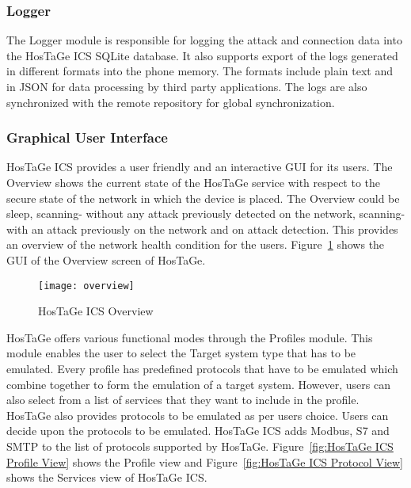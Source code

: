 \documentclass[article,msc=informatik,type=msc,colorback,accentcolor=tud9c]{tudthesis}
\begin{document}
       \subsubsection{Logger}\label{Logger}
       The Logger module is responsible for logging the attack and connection data into the HosTaGe ICS SQLite database. It also supports export of the logs generated in different formats into the phone memory. The formats include plain text and in \ac{JSON} for data processing by third party applications. The logs are also synchronized with the remote repository for global synchronization. 
       
       \vspace{5mm} 
       \subsubsection{Graphical User Interface}\label{Graphical User Interface}
       HosTaGe ICS provides a user friendly and an interactive GUI for its users. The Overview shows the current state of the HosTaGe service with respect to the secure state of the network in which the device is placed. The Overview could be sleep, scanning- without any attack previously detected on the network,  scanning- with an attack previously on the network and on attack detection. This provides an overview of the network health condition for the users. Figure~\ref{f:HosTaGe ICS Overview} shows the GUI of the Overview screen of  HosTaGe.
       
        \begin{figure}[h]
         \centering
                    \texttt{[image: overview]}
                    \caption[HosTaGe ICS Overview]{\label{f:HosTaGe ICS Overview}HosTaGe ICS Overview}
         \end{figure}
       
       HosTaGe offers various functional modes through the Profiles module. This module enables the user to select the Target system type that has to be emulated. Every profile has predefined protocols that have to be emulated which combine together to form the emulation of a target system. However, users can also select from a list of services that they want to include in the profile. HosTaGe also provides protocols to be emulated as per users choice. Users can decide upon the protocols to be emulated. HosTaGe ICS adds Modbus, \ac{S7} and \ac{SMTP} to the list of protocols supported by HosTaGe. Figure~\ref{fig:HosTaGe ICS Profile View} shows the Profile view and Figure~\ref{fig:HosTaGe ICS Protocol View} shows the Services view of HosTaGe ICS. 
       
\end{document}
